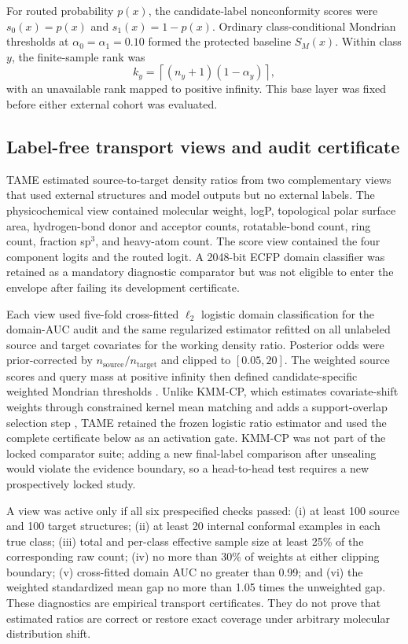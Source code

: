 For routed probability $p(x)$, the candidate-label nonconformity scores were $s_0(x)=p(x)$ and $s_1(x)=1-p(x)$. Ordinary class-conditional Mondrian thresholds at $\alpha_0=\alpha_1=0.10$ formed the protected baseline $S_M(x)$. Within class $y$, the finite-sample rank was
\begin{equation}
 k_y=\left\lceil(n_y+1)(1-\alpha_y)\right\rceil ,
\end{equation}
with an unavailable rank mapped to positive infinity. This base layer was fixed before either external cohort was evaluated.

\subsection{Label-free transport views and audit certificate}
\label{sec:methods_transport}

TAME estimated source-to-target density ratios from two complementary views that used external structures and model outputs but no external labels. The physicochemical view contained molecular weight, logP, topological polar surface area, hydrogen-bond donor and acceptor counts, rotatable-bond count, ring count, fraction sp$^3$, and heavy-atom count. The score view contained the four component logits and the routed logit. A 2048-bit ECFP domain classifier was retained as a mandatory diagnostic comparator but was not eligible to enter the envelope after failing its development certificate.

Each view used five-fold cross-fitted $\ell_2$ logistic domain classification for the domain-AUC audit and the same regularized estimator refitted on all unlabeled source and target covariates for the working density ratio. Posterior odds were prior-corrected by $n_{\mathrm{source}}/n_{\mathrm{target}}$ and clipped to $[0.05,20]$. The weighted source scores and query mass at positive infinity then defined candidate-specific weighted Mondrian thresholds \citep{tibshirani2019covariate,laghuvarapu2023codrug}. Unlike KMM-CP, which estimates covariate-shift weights through constrained kernel mean matching and adds a support-overlap selection step \citep{laghuvarapu2026kmmcp}, TAME retained the frozen logistic ratio estimator and used the complete certificate below as an activation gate. KMM-CP was not part of the locked comparator suite; adding a new final-label comparison after unsealing would violate the evidence boundary, so a head-to-head test requires a new prospectively locked study.

A view was active only if all six prespecified checks passed: (i) at least 100 source and 100 target structures; (ii) at least 20 internal conformal examples in each true class; (iii) total and per-class effective sample size at least 25\% of the corresponding raw count; (iv) no more than 30\% of weights at either clipping boundary; (v) cross-fitted domain AUC no greater than 0.99; and (vi) the weighted standardized mean gap no more than 1.05 times the unweighted gap. These diagnostics are empirical transport certificates. They do not prove that estimated ratios are correct or restore exact coverage under arbitrary molecular distribution shift.

